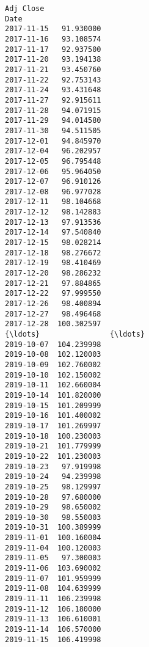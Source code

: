 \documentclass[11pt]{article}
\begin{document}
\begin{Verbatim}[commandchars=\\\{\}]
             Adj Close  
Date                    
2017-11-15   91.930000  
2017-11-16   93.108574  
2017-11-17   92.937500  
2017-11-20   93.194138  
2017-11-21   93.450760  
2017-11-22   92.753143  
2017-11-24   93.431648  
2017-11-27   92.915611  
2017-11-28   94.071915  
2017-11-29   94.014580  
2017-11-30   94.511505  
2017-12-01   94.845970  
2017-12-04   96.202957  
2017-12-05   96.795448  
2017-12-06   95.964050  
2017-12-07   96.910126  
2017-12-08   96.977028  
2017-12-11   98.104668  
2017-12-12   98.142883  
2017-12-13   97.913536  
2017-12-14   97.540840  
2017-12-15   98.028214  
2017-12-18   98.276672  
2017-12-19   98.410469  
2017-12-20   98.286232  
2017-12-21   97.884865  
2017-12-22   97.999550  
2017-12-26   98.400894  
2017-12-27   98.496468  
2017-12-28  100.302597  
{\ldots}                {\ldots}  
2019-10-07  104.239998  
2019-10-08  102.120003  
2019-10-09  102.760002  
2019-10-10  102.150002  
2019-10-11  102.660004  
2019-10-14  101.820000  
2019-10-15  101.209999  
2019-10-16  101.400002  
2019-10-17  101.269997  
2019-10-18  100.230003  
2019-10-21  101.779999  
2019-10-22  101.230003  
2019-10-23   97.919998  
2019-10-24   94.239998  
2019-10-25   98.129997  
2019-10-28   97.680000  
2019-10-29   98.650002  
2019-10-30   98.550003  
2019-10-31  100.389999  
2019-11-01  100.160004  
2019-11-04  100.120003  
2019-11-05   97.300003  
2019-11-06  103.690002  
2019-11-07  101.959999  
2019-11-08  104.639999  
2019-11-11  106.239998  
2019-11-12  106.180000  
2019-11-13  106.610001  
2019-11-14  106.570000  
2019-11-15  106.419998  


\end{Verbatim}
\end{document}
